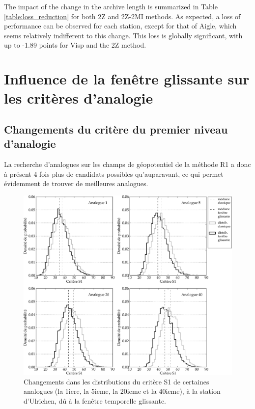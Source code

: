 \documentclass[hess]{copernicus}
\begin{document}
The impact of the change in the archive length is summarized in Table \ref{table:loss_reduction} for both 2Z and 2Z-2MI methods. As expected, a loss of performance can be observed for each station, except for that of Aigle, which seems relatively indifferent to this change. This loss is globally significant, with up to -1.89 points for Visp and the 2Z method. 


\section{Influence de la fenêtre glissante sur les critères d'analogie}


\subsection{Changements du critère du premier niveau d'analogie}


La recherche d'analogues sur les champs de géopotentiel de la méthode R1 a donc à présent 4 fois plus de candidats possibles qu'auparavant, ce qui permet évidemment de trouver de meilleures analogues. 

\begin{figure}[htb]
	\begin{center}
		\includegraphics[width=15cm]{figures/Graphique_fenetre_glissante_chmts_S1_analogues.pdf}
	\end{center}
	\caption{Changements dans les distributions du critère S1 de certaines analogues (la 1iere, la 5ieme, la 20ieme et la 40ieme), à la station d'Ulrichen, dû à la fenêtre temporelle glissante.}
	\label{fig:Graphique_fenetre_glissante_chmts_S1_analogues}
\end{figure}
\end{document}
